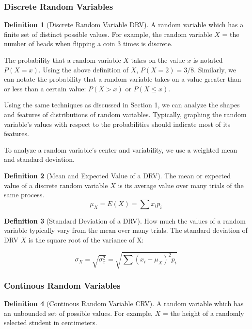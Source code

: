\documentclass[12pt, a4paper]{article}
\theoremstyle{definition}
\newtheorem{definition}{Definition}
\begin{document}
\subsubsection{Discrete Random Variables}

\begin{definition}[Discrete Random Variable DRV]
    A random variable which has a finite set of distinct possible values.
    For example, the random variable $X$ = the number of heads when flipping a coin 3 times is discrete.
\end{definition}

The probability that a random variable $X$ takes on the value $x$ is notated $P(X = x)$.
Using the above definition of $X$, $P(X = 2) = 3/8$.
Similarly, we can notate the probability that a random variable takes on a value greater than or less than a certain value: $P(X > x)$ or $P(X \leq x)$.

Using the same techniques as discussed in Section 1, we can analyze the shapes and features of distributions of random variables.
Typically, graphing the random variable's values with respect to the probabilities should indicate most of its features.

To analyze a random variable's center and variability, we use a weighted mean and standard deviation.

\begin{definition}[Mean and Expected Value of a DRV]
    The mean or expected value of a discrete random variable $X$ is its average value over many trials of the same process.
    \[\mu_X = E(X) = \sum x_i p_i\]
\end{definition}

\begin{definition}[Standard Deviation of a DRV]
    How much the values of a random variable typically vary from the mean over many trials.
    The standard deviation of DRV $X$ is the square root of the variance of X:

    \[\sigma_X = \sqrt{\sigma_x^2} = \sqrt{\sum (x_i - \mu_X)^2 p_i}\]
\end{definition}

\subsubsection{Continous Random Variables}

\begin{definition}[Continous Random Variable CRV]
    A random variable which has an unbounded set of possible values.
    For example, $X$ = the height of a randomly selected student in centimeters.
\end{definition}
\end{document}
